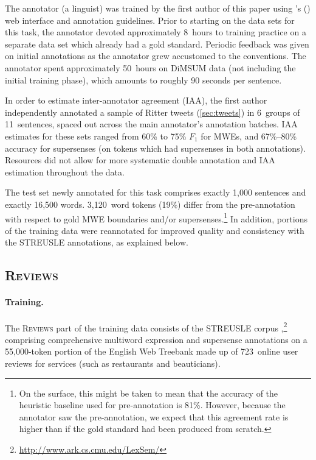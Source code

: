 \documentclass[11pt,letterpaper]{article}
\newcommand{\citeposs}[1]{\citeauthor{#1}'s (\citeyear{#1})}
\newcommand{\dataset}[1]{\mbox{\textsc{#1}}}	%
\begin{document}
The annotator (a linguist) was trained by the first author of this paper  
using \citeposs{schneider-15} web interface and annotation guidelines.
Prior to starting on the data sets for this task,
the annotator devoted approximately 8~hours to training practice 
on a separate data set which already had a gold standard.
Periodic feedback was given on initial annotations as the annotator grew accustomed to the conventions.
The annotator spent approximately 50~hours on DiMSUM data (not including the initial training phase), 
which amounts to roughly 90 seconds per sentence. 

In order to estimate inter-annotator agreement (IAA),
the first author independently annotated a sample of Ritter tweets (\cref{sec:tweets}) 
in 6~groups of 11~sentences, spaced out across the main annotator's annotation batches. 
IAA estimates for these sets ranged from 60\% to 75\% $F_1$ for MWEs, and 
67\%--80\% accuracy for supersenses (on tokens which had supersenses in both annotations).
Resources did not allow for more systematic double annotation and IAA estimation 
throughout the data.


The test set newly annotated for this task comprises exactly 1,000 sentences and exactly 16,500 words.
3,120~word tokens (19\%) differ from the pre-annotation with respect to gold MWE boundaries and/or supersenses.\footnote{On the surface, 
this might be taken to mean that the accuracy of the heuristic baseline used for pre-annotation is 81\%. 
However, because the annotator saw the pre-annotation, we expect that this agreement rate 
is higher than if the gold standard had been produced from scratch.}
In addition, portions of the training data were reannotated for improved quality and consistency 
with the STREUSLE annotations, as explained below.

\subsection{\dataset{Reviews}} 
\paragraph{Training.}
The \dataset{Reviews} part of the training data consists of the STREUSLE corpus \citep{schneider-14-corpus,schneider-15},\footnote{\url{http://www.ark.cs.cmu.edu/LexSem/}}
comprising comprehensive multiword expression and supersense annotations on a 55,000-token portion of the English Web Treebank \citep[EWTB;][]{ewtb} 
made up of 723~online user reviews for services (such as restaurants and beauticians).
\end{document}
